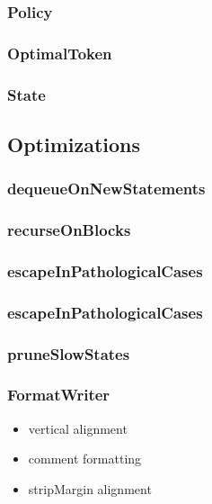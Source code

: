 \subsubsection{Policy}
\subsubsection{OptimalToken}
\subsubsection{State}
\subsection{Optimizations}
\subsubsection{dequeueOnNewStatements}
\subsubsection{recurseOnBlocks}
\subsubsection{escapeInPathologicalCases}
\subsubsection{escapeInPathologicalCases}
\subsubsection{pruneSlowStates}
\subsubsection{FormatWriter}
\begin{itemize}
  \item vertical alignment
  \item comment formatting
  \item stripMargin alignment
\end{itemize}
